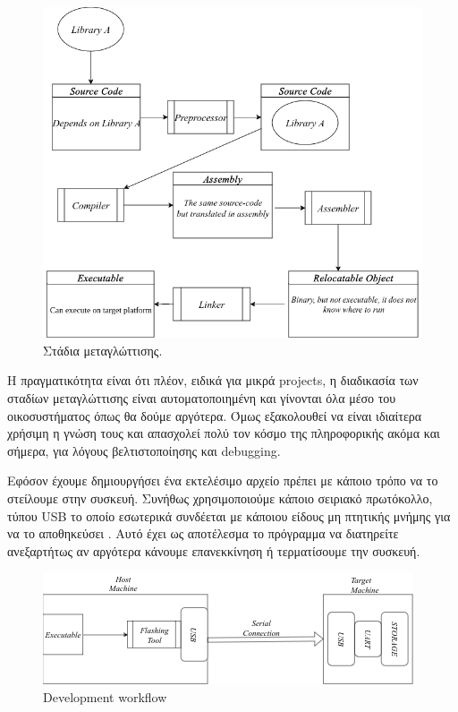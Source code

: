 \begin{figure}[h!]
\centering
\includegraphics[scale=0.4]{images/introduction/compilation_stages.png}
\caption{Στάδια μεταγλώττισης.}
 \label{fig:compilation_stages}
\end{figure}

Η πραγματικότητα είναι ότι πλέον, ειδικά για μικρά projects, η διαδικασία
των σταδίων μεταγλώττισης είναι αυτοματοποιημένη και γίνονται όλα μέσο του
οικοσυστήματος όπως θα δούμε αργότερα. Όμως εξακολουθεί να είναι ιδιαίτερα χρήσιμη η γνώση
τους και απασχολεί πολύ τον κόσμο της πληροφορικής ακόμα και σήμερα, για λόγους βελτιστοποίησης 
και debugging.

Εφόσον έχουμε δημιουργήσει ένα εκτελέσιμο αρχείο πρέπει με κάποιο τρόπο να το στείλουμε στην συσκευή.
Συνήθως χρησιμοποιούμε κάποιο σειριακό πρωτόκολλο, τύπου USB το οποίο εσωτερικά συνδέεται με κάποιου είδους
μη πτητικής μνήμης για να το αποθηκεύσει . Αυτό έχει ως αποτέλεσμα το πρόγραμμα να διατηρείτε ανεξαρτήτως
αν αργότερα κάνουμε επανεκκίνηση ή τερματίσουμε την συσκευή.

\begin{figure}[h!]
\centering
\includegraphics[scale=0.73]{images/introduction/programming_embedded.png}
\caption{Development workflow}
 \label{fig:embedded_workflow}
\end{figure}

